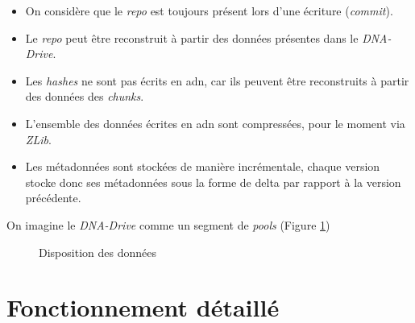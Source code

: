 \documentclass[a4paper]{report}
\begin{document}
\begin{itemize}
\item
  On considère que le \emph{repo} est toujours présent lors d'une
  écriture (\emph{commit}).
\item
  Le \emph{repo} peut être reconstruit à partir des données présentes
  dans le \emph{DNA-Drive}.
\item
  Les \emph{hashes} ne sont pas écrits en \ac{adn}, car ils peuvent être
  reconstruits à partir des données des \emph{chunks}.
\item
  L'ensemble des données écrites en \ac{adn} sont compressées, pour le moment
  via \emph{ZLib}.
\item
  Les métadonnées sont stockées de manière incrémentale, chaque version
  stocke donc ses métadonnées sous la forme de delta par rapport à la
  version précédente.
\end{itemize}

On imagine le \emph{DNA-Drive} comme un segment de \emph{pools} (Figure \ref{fig:data-layout})

\begin{figure}[ht]
\centering


\caption{Disposition des données}
\label{fig:data-layout}
\end{figure}


\chapter{Fonctionnement détaillé}
\end{document}
